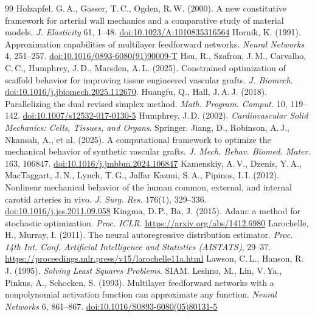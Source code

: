\begin{thebibliography}{99}
 Holzapfel, G.\,A., Gasser, T.\,C., Ogden, R.\,W. (2000). A new constitutive framework for arterial wall mechanics and a comparative study of material models. \emph{J. Elasticity} 61, 1--48. \href{https://doi.org/10.1023/A:1010835316564}{doi:10.1023/A:1010835316564}
 Hornik, K. (1991). Approximation capabilities of multilayer feedforward networks. \emph{Neural Networks} 4, 251--257. \href{https://doi.org/10.1016/0893-6080(91)90009-T}{doi:10.1016/0893-6080(91)90009-T}
 Hsu, R., Szafron, J.\,M., Carvalho, C.\,C., Humphrey, J.\,D., Marsden, A.\,L. (2025). Constrained optimization of scaffold behavior for improving tissue engineered vascular grafts. \emph{J. Biomech.} \href{https://doi.org/10.1016/j.jbiomech.2025.112670}{doi:10.1016/j.jbiomech.2025.112670}.
 Huangfu, Q., Hall, J.\,A.\,J. (2018). Parallelizing the dual revised simplex method. \emph{Math. Program. Comput.} 10, 119--142. \href{https://doi.org/10.1007/s12532-017-0130-5}{doi:10.1007/s12532-017-0130-5}
 Humphrey, J.\,D. (2002). \emph{Cardiovascular Solid Mechanics: Cells, Tissues, and Organs}. Springer.
 Jiang, D., Robinson, A.\,J., Nkansah, A., et al. (2025). A computational framework to optimize the mechanical behavior of synthetic vascular grafts. \emph{J. Mech. Behav. Biomed. Mater.} 163, 106847. \href{https://doi.org/10.1016/j.jmbbm.2024.106847}{doi:10.1016/j.jmbbm.2024.106847}
 Kamenskiy, A.\,V., Dzenis, Y.\,A., MacTaggart, J.\,N., Lynch, T.\,G., Jaffar Kazmi, S.\,A., Pipinos, I.\,I. (2012). Nonlinear mechanical behavior of the human common, external, and internal carotid arteries in vivo. \emph{J. Surg. Res.} 176(1), 329--336. \href{https://doi.org/10.1016/j.jss.2011.09.058}{doi:10.1016/j.jss.2011.09.058}
 Kingma, D.\,P., Ba, J. (2015). Adam: a method for stochastic optimization. \emph{Proc. ICLR}. \url{https://arxiv.org/abs/1412.6980}
 Larochelle, H., Murray, I. (2011). The neural autoregressive distribution estimator. \emph{Proc. 14th Int. Conf. Artificial Intelligence and Statistics (AISTATS)}, 29--37. \url{https://proceedings.mlr.press/v15/larochelle11a.html}
 Lawson, C.\,L., Hanson, R.\,J. (1995). \emph{Solving Least Squares Problems}. SIAM.
 Leshno, M., Lin, V.\,Ya., Pinkus, A., Schocken, S. (1993). Multilayer feedforward networks with a nonpolynomial activation function can approximate any function. \emph{Neural Networks} 6, 861--867. \href{https://doi.org/10.1016/S0893-6080(05)80131-5}{doi:10.1016/S0893-6080(05)80131-5}

\end{thebibliography}
